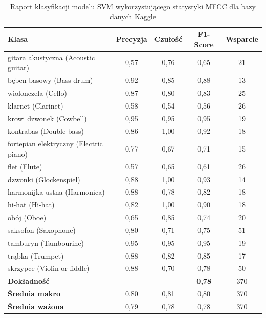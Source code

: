 \documentclass{SGGW-thesis}
\begin{document}
\begin{table}[H]
\centering
\caption{Raport klasyfikacji modelu SVM wykorzystującego statystyki MFCC dla bazy danych Kaggle}
\label{tab:svm_mfcc_kaggle}
\begin{tabular}{lcccc}
\toprule
\textbf{Klasa} & \textbf{Precyzja} & \textbf{Czułość} & \textbf{F1-Score} & \textbf{Wsparcie} \\
\midrule
gitara akustyczna (Acoustic guitar) & 0,57 & 0,76 & 0,65 & 21 \\
bęben basowy (Bass drum) & 0,92 & 0,85 & 0,88 & 13 \\
wiolonczela (Cello) & 0,87 & 0,80 & 0,83 & 25 \\
klarnet (Clarinet) & 0,58 & 0,54 & 0,56 & 26 \\
krowi dzwonek (Cowbell) & 0,95 & 0,95 & 0,95 & 19 \\
kontrabas (Double bass) & 0,86 & 1,00 & 0,92 & 18 \\
fortepian elektryczny (Electric piano) & 0,77 & 0,67 & 0,71 & 15 \\
flet (Flute) & 0,57 & 0,65 & 0,61 & 26 \\
dzwonki (Glockenspiel) & 0,88 & 1,00 & 0,93 & 14 \\
harmonijka ustna (Harmonica) & 0,88 & 0,78 & 0,82 & 18 \\
hi-hat (Hi-hat) & 0,82 & 1,00 & 0,90 & 18 \\
obój (Oboe) & 0,65 & 0,85 & 0,74 & 20 \\
saksofon (Saxophone) & 0,80 & 0,71 & 0,75 & 51 \\
tamburyn (Tambourine) & 0,95 & 0,95 & 0,95 & 19 \\
trąbka (Trumpet) & 0,88 & 0,82 & 0,85 & 17 \\
skrzypce (Violin or fiddle) & 0,88 & 0,70 & 0,78 & 50 \\
\midrule
\textbf{Dokładność} & & & \textbf{0,78} & 370 \\
\textbf{Średnia makro} & 0,80 & 0,81 & 0,80 & 370 \\
\textbf{Średnia ważona} & 0,79 & 0,78 & 0,78 & 370 \\
\bottomrule
\end{tabular}
\end{table}
\end{document}
